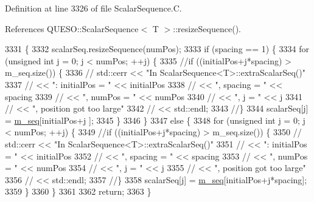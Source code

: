 Definition at line 3326 of file Scalar\-Sequence.\-C.



References Q\-U\-E\-S\-O\-::\-Scalar\-Sequence$<$ T $>$\-::resize\-Sequence().


\begin{DoxyCode}
3331 \{
3332   scalarSeq.resizeSequence(numPos);
3333   \textcolor{keywordflow}{if} (spacing == 1) \{
3334     \textcolor{keywordflow}{for} (\textcolor{keywordtype}{unsigned} \textcolor{keywordtype}{int} j = 0; j < numPos; ++j) \{
3335       \textcolor{comment}{//if ((initialPos+j*spacing) > m\_seq.size()) \{}
3336       \textcolor{comment}{//  std::cerr << "In ScalarSequence<T>::extraScalarSeq()"}
3337       \textcolor{comment}{//            << ": initialPos = " << initialPos}
3338       \textcolor{comment}{//            << ", spacing = "    << spacing}
3339       \textcolor{comment}{//            << ", numPos = "     << numPos}
3340       \textcolor{comment}{//            << ", j = "          << j}
3341       \textcolor{comment}{//            << ", position got too large"}
3342       \textcolor{comment}{//            << std::endl;}
3343       \textcolor{comment}{//\}}
3344       scalarSeq[j] = \hyperlink{class_q_u_e_s_o_1_1_scalar_sequence_ae616036fd2e62fb69df167814545e893}{m\_seq}[initialPos+j        ];
3345     \}
3346   \}
3347   \textcolor{keywordflow}{else} \{
3348     \textcolor{keywordflow}{for} (\textcolor{keywordtype}{unsigned} \textcolor{keywordtype}{int} j = 0; j < numPos; ++j) \{
3349       \textcolor{comment}{//if ((initialPos+j*spacing) > m\_seq.size()) \{}
3350       \textcolor{comment}{//  std::cerr << "In ScalarSequence<T>::extraScalarSeq()"}
3351       \textcolor{comment}{//            << ": initialPos = " << initialPos}
3352       \textcolor{comment}{//            << ", spacing = "    << spacing}
3353       \textcolor{comment}{//            << ", numPos = "     << numPos}
3354       \textcolor{comment}{//            << ", j = "          << j}
3355       \textcolor{comment}{//            << ", position got too large"}
3356       \textcolor{comment}{//            << std::endl;}
3357       \textcolor{comment}{//\}}
3358       scalarSeq[j] = \hyperlink{class_q_u_e_s_o_1_1_scalar_sequence_ae616036fd2e62fb69df167814545e893}{m\_seq}[initialPos+j*spacing];
3359     \}
3360   \}
3361 
3362   \textcolor{keywordflow}{return};
3363 \}
\end{DoxyCode}
